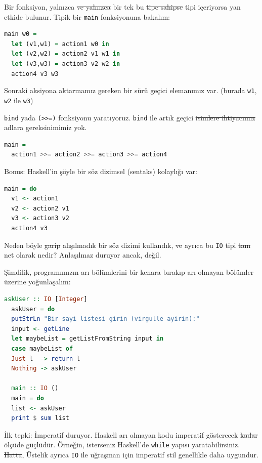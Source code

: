 \documentclass[a4paper,14pt,openany]{extbook} %
\begin{document}
Bir fonksiyon, yalnızca \st{ve yalnızca} bir tek bu \st{tipe sahipse} tipi içeriyorsa yan etkide bulunur. Tipik bir \lstinline!main! fonksiyonuna bakalım:

\begin{lstlisting}[language=Haskell]
  main w0 =
  let (v1,w1) = action1 w0 in
  let (v2,w2) = action2 v1 w1 in
  let (v3,w3) = action3 v2 w2 in
  action4 v3 w3
\end{lstlisting}

  Sonraki aksiyona aktarmamız gereken bir sürü geçici elemanımız var.
  (burada \lstinline!w1!, \lstinline!w2! ile \lstinline!w3!)

  \lstinline!bind! yada \lstinline!(>>=)! fonksiyonu yaratıyoruz.
  \lstinline!bind! ile artık geçici \st{isimlere ihtiyacımız} adlara gereksinimimiz yok.

\begin{lstlisting}[language=Haskell]
  main =
  action1 >>= action2 >>= action3 >>= action4
\end{lstlisting}

Bonus: Haskell'in şöyle bir söz dizimsel (sentaks) kolaylığı var:

\begin{lstlisting}[language=Haskell]
  main = do
  v1 <- action1
  v2 <- action2 v1
  v3 <- action3 v2
  action4 v3
\end{lstlisting}


Neden böyle \st{garip} alışılmadık bir söz dizimi kullandık, \st{ve} ayrıca bu \lstinline!IO! tipi \st{tam}
net olarak nedir? Anlaşılmaz duruyor ancak, değil.

Şimdilik, programımızın arı bölümlerini bir kenara bırakıp arı olmayan
bölümler üzerine yoğunlaşalım:

\begin{lstlisting}[language=Haskell]
  askUser :: IO [Integer]
  askUser = do
  putStrLn "Bir sayi listesi girin (virgulle ayirin):"
  input <- getLine
  let maybeList = getListFromString input in
  case maybeList of
  Just l  -> return l
  Nothing -> askUser

  main :: IO ()
  main = do
  list <- askUser
  print $ sum list
\end{lstlisting}

İlk tepki: İmperatif duruyor. Haskell arı olmayan kodu imperatif
gösterecek \st{kadar} ölçüde güçlüdür. Örneğin, isterseniz Haskell'de
\lstinline!while! yapısı yaratabilirsiniz. \st{Hatta}, Üstelik ayrıca \lstinline!IO! ile
uğraşman için imperatif stil genellikle daha uygundur.
\end{document}
